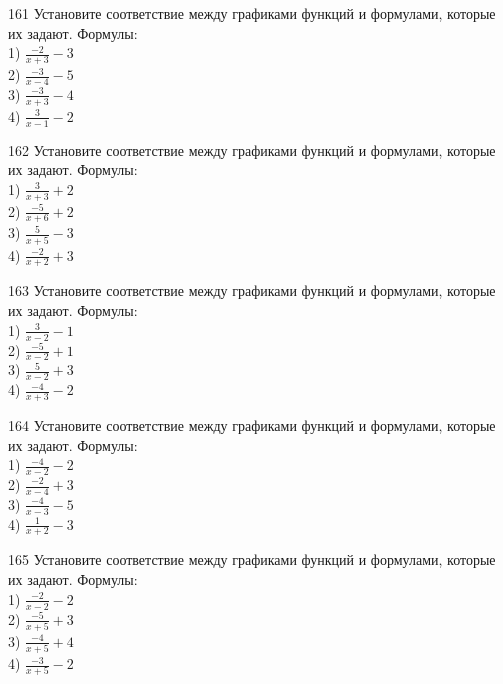 \documentclass[4apaper]{article}
\begin{document}
\begin{taskBN}{161}
Установите соответствие между графиками функций и формулами, которые их задают. Формулы: \\1) $\frac{-2}{x+3}-3$\\2) $\frac{-3}{x-4}-5$\\3) $\frac{-3}{x+3}-4$\\4) $\frac{3}{x-1}-2$
\end{taskBN}

\begin{taskBN}{162}
Установите соответствие между графиками функций и формулами, которые их задают. Формулы: \\1) $\frac{3}{x+3}+2$\\2) $\frac{-5}{x+6}+2$\\3) $\frac{5}{x+5}-3$\\4) $\frac{-2}{x+2}+3$
\end{taskBN}

\begin{taskBN}{163}
Установите соответствие между графиками функций и формулами, которые их задают. Формулы: \\1) $\frac{3}{x-2}-1$\\2) $\frac{-5}{x-2}+1$\\3) $\frac{5}{x-2}+3$\\4) $\frac{-4}{x+3}-2$
\end{taskBN}

\begin{taskBN}{164}
Установите соответствие между графиками функций и формулами, которые их задают. Формулы: \\1) $\frac{-4}{x-2}-2$\\2) $\frac{-2}{x-4}+3$\\3) $\frac{-4}{x-3}-5$\\4) $\frac{1}{x+2}-3$
\end{taskBN}

\begin{taskBN}{165}
Установите соответствие между графиками функций и формулами, которые их задают. Формулы: \\1) $\frac{-2}{x-2}-2$\\2) $\frac{-5}{x+5}+3$\\3) $\frac{-4}{x+5}+4$\\4) $\frac{-3}{x+5}-2$
\end{taskBN}
\end{document}
